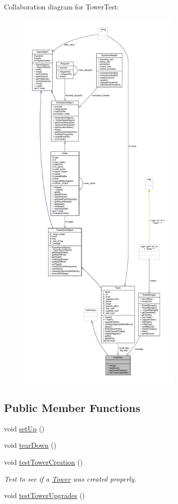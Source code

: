 Collaboration diagram for Tower\+Test\+:
\nopagebreak
\begin{figure}[H]
\begin{center}
\leavevmode
\includegraphics[height=550pt]{class_tower_test__coll__graph}
\end{center}
\end{figure}
\subsection*{Public Member Functions}
\begin{DoxyCompactItemize}
\item 
void \hyperlink{class_tower_test_aa5b9633ca71b4020fb635758e39d98ad}{set\+Up} ()
\item 
void \hyperlink{class_tower_test_a7bf8aca6222828f090a609dbdaa079e5}{tear\+Down} ()
\item 
void \hyperlink{class_tower_test_ae5b50cb7653385e1cc8a03565c22a7ad}{test\+Tower\+Creation} ()
\begin{DoxyCompactList}\small\item\em Test to see if a \hyperlink{class_tower}{Tower} was created properly. \end{DoxyCompactList}\item 
void \hyperlink{class_tower_test_ace6c736cadac380b8d9adf0d7c853979}{test\+Tower\+Upgrades} ()
\end{DoxyCompactItemize}
